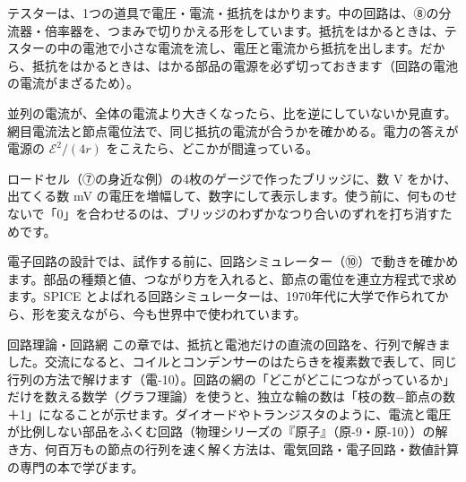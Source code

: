 \begin{phkougaku}
テスターは、1つの道具で電圧・電流・抵抗をはかります。中の回路は、⑧の分流器・倍率器を、つまみで切りかえる形をしています。抵抗をはかるときは、テスターの中の電池で小さな電流を流し、電圧と電流から抵抗を出します。だから、抵抗をはかるときは、はかる部品の電源を必ず切っておきます（回路の電池の電流がまざるため）。

\begin{phketa}[直流回路の数の目安]
並列の電流が、全体の電流より大きくなったら、比を逆にしていないか見直す。網目電流法と節点電位法で、同じ抵抗の電流が合うかを確かめる。電力の答えが電源の $\mathcal E^2/(4r)$ をこえたら、どこかが間違っている。
\end{phketa}

ロードセル（⑦の身近な例）の4枚のゲージで作ったブリッジに、数 V をかけ、出てくる数 mV の電圧を増幅して、数字にして表示します。使う前に、何ものせないで「0」を合わせるのは、ブリッジのわずかなつり合いのずれを打ち消すためです。

電子回路の設計では、試作する前に、回路シミュレーター（⑩）で動きを確かめます。部品の種類と値、つながり方を入れると、節点の電位を連立方程式で求めます。SPICE とよばれる回路シミュレーターは、1970年代に大学で作られてから、形を変えながら、今も世界中で使われています。
\end{phkougaku}

\begin{phsaki}{回路理論・回路網}
この章では、抵抗と電池だけの直流の回路を、行列で解きました。交流になると、コイルとコンデンサーのはたらきを複素数で表して、同じ行列の方法で解けます（電-10）。回路の網の「どこがどこにつながっているか」だけを数える数学（グラフ理論）を使うと、独立な輪の数は「枝の数−節点の数＋1」になることが示せます。ダイオードやトランジスタのように、電流と電圧が比例しない部品をふくむ回路（物理シリーズの『原子』（原-9・原-10））の解き方、何百万もの節点の行列を速く解く方法は、電気回路・電子回路・数値計算の専門の本で学びます。
\end{phsaki}

